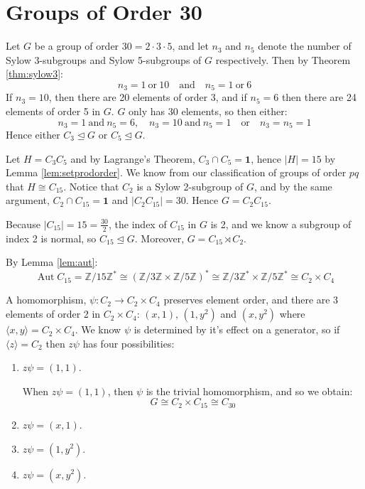 \documentclass[a4paper, oneside, 12pt, final]{article}
\theoremstyle{definition}
\DeclareMathOperator{\Aut}{Aut}
\newcommand{\Z}{\mathbb{Z}}
\newcommand{\Zn}[1]{\Z/#1\Z}
\begin{document}

\section{Groups of Order 30}
Let \(G\) be a group of order \(30 = 2 \cdot 3 \cdot 5\), and let \(n_3\) and
\(n_5\) denote the number of Sylow 3-subgroups and Sylow 5-subgroups of \(G\)
respectively.
Then by Theorem \ref{thm:sylow3}:
\[n_3 = 1 \ \text{or} \ 10 \quad \text{and} \quad n_5 = 1 \ \text{or} \ 6\]
If \(n_3 = 10\), then there are 20 elements of order 3, and if \(n_5 = 6\) then
there are 24 elements of order 5 in \(G\).
\(G\) only has 30 elements, so then either:
\[n_3 = 1 \ \text{and} \ n_5 = 6, \quad n_3 = 10 \ \text{and} \ n_5 = 1 \quad \text{or} \quad n_3 = n_5 = 1\]
Hence either \(C_3 \unlhd G\) or \(C_5 \unlhd G\).

Let \(H = C_3C_5\) and by Lagrange's Theorem, \(C_3 \cap C_5 = \bm{1}\), hence
\(|H| = 15\) by Lemma \ref{lem:setprodorder}.
We know from our classification of groups of order \(pq\) that \(H \cong C_{15}\).
Notice that \(C_2\) is a Sylow 2-subgroup of \(G\), and by the same argument,
\(C_2 \cap C_{15} = \bm{1}\) and \(|C_2C_{15}| = 30\).
Hence \(G = C_2C_{15}\).

Because \(|C_{15}| = 15 = \frac{30}{2}\), the index of \(C_{15}\) in \(G\) is
2, and we know a subgroup of index 2 is normal, so \(C_{15} \unlhd G\).
Moreover, \(G = C_{15} \rtimes C_2\).

By Lemma \ref{lem:aut}:
\[\Aut{C_{15}} = \Zn{15}^* \cong (\Zn{3} \times \Zn{5})^* \cong \Zn{3}^* \times \Zn{5}^* \cong C_2 \times C_4\]

A homomorphism, \(\psi:C_2 \to C_2 \times C_4\) preserves element order, and
there are 3 elements of order 2 in \(C_2 \times C_4\): \((x, 1)\), \((1, y^2)\)
and \((x, y^2)\) where \(\langle x, y \rangle = C_2 \times C_4\).
We know \(\psi\) is determined by it's effect on a generator, so if \(\langle z
\rangle = C_2\) then \(z\psi\) has four possibilities:

\begin{enumerate}
    \item \(z\psi = (1, 1)\).

        When \(z\psi = (1, 1)\), then \(\psi\) is the trivial homomorphism, and
        so we obtain:
        \[G \cong C_2 \times C_{15} \cong C_{30}\]

    \item \(z\psi = (x, 1)\).
    \item \(z\psi = (1, y^2)\).
    \item \(z\psi = (x, y^2)\).
\end{enumerate}
\end{document}
